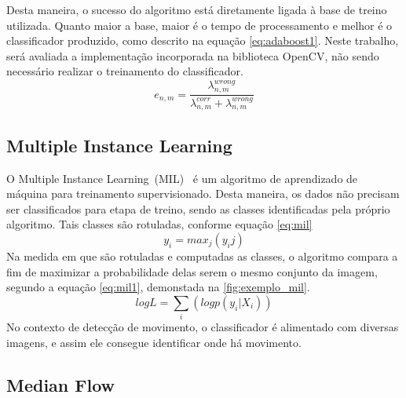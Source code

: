 \documentclass[12pt,oneside,a4paper,chapter=TITLE,section=TITLE,sumario=tradicional]{abntex2}
\begin{document}
Desta maneira, o sucesso do algoritmo está diretamente ligada à base de treino utilizada. Quanto maior a base, maior é o tempo de processamento e melhor é o classificador produzido, como descrito na equação \ref{eq:adaboost1}. Neste trabalho, será avaliada a implementação incorporada na biblioteca OpenCV, não sendo necessário realizar o treinamento do classificador.
\begin{equation}
\label{eq:adaboost1}
e_{n,m} = \frac{\lambda^{wrong}_{n,m}}{\lambda^{corr}_{n,m} + \lambda^{wrong}_{n,m}}
\end{equation}

\begin{figure}[htb]
\end{figure}

\subsection{Multiple Instance Learning}

O Multiple Instance Learning~(MIL)~\cite{Babenko09visualtracking} é um algoritmo de aprendizado de máquina para treinamento supervisionado. Desta maneira, os dados não precisam ser classificados para etapa de treino, sendo as classes identificadas pela próprio algoritmo. 
Tais classes são rotuladas, conforme equação \ref{eq:mil}
\begin{equation}
\label{eq:mil}
y_i = max_j (y_ij)
\end{equation}
Na medida em que são rotuladas e computadas as classes, o algoritmo compara a fim de maximizar a probabilidade delas serem o mesmo conjunto da imagem, segundo a equação \ref{eq:mil1}, demonstada na \autoref{fig:exemplo_mil}.
\begin{equation}
\label{eq:mil1}
log L = \sum_i (log p(y_i | X_i))
\end{equation}
No contexto de detecção de movimento, o classificador é alimentado com diversas imagens, e assim ele consegue identificar onde há movimento.
\begin{figure}[htb]
\end{figure}

\subsection{Median Flow}
\end{document}
